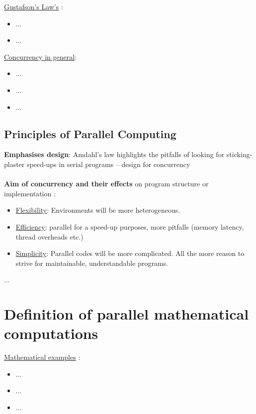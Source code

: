 \underline{Gustafson’s Law's} \parencite{inbook1}:
\begin{itemize}
	\item ...\parencite[see][p81]{inbook1}
	\item ...\parencite[see][p87]{inbook1}\\
\end{itemize}

\underline{Concurrency in general}:
\begin{itemize}
	\item ...\parencite[see][p3]{internet1}
	\item ...\parencite[see][p3]{internet2}
	\item ...
\end{itemize}

\newpage

\subsection{Principles of Parallel Computing}

\textbf{Emphasises design}:
Amdahl's law highlights the pitfalls of looking for
sticking-plaster speed-ups in serial programs –
design for concurrency \parencite[see][p4]{article6}
\\\\\textbf{Aim of concurrency and their effects} on program structure or implementation \parencite[see][p5]{article6}:
\begin{itemize}
  \item \underline{Flexibility}: Environments will be more heterogeneous.
  \item \underline{Efficiency}:	parallel for a speed-up purposes, more pitfalls (memory latency, thread overheads etc.)
  \item \underline{Simplicity}:	Parallel codes will be more complicated. All the more reason to strive for maintainable, understandable programs.\\
\end{itemize}
...\parencite[see][p11 ff.]{article6}

\newpage

\section{Definition of parallel mathematical computations}

\underline{Mathematical examples} \parencite{inbook1}:
\begin{itemize}
	\item ...\parencite[see][p8]{internet1}
	\item ...\parencite[see][p4]{internet2}
	\item ...\parencite[see][p398]{article7}
\end{itemize}

